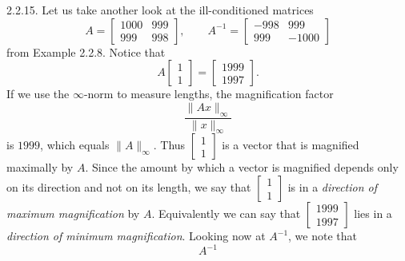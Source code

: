 \documentclass{report}
\begin{document}
    \bigbreak \noindent 
    \begin{mdframed}
        2.2.15. Let us take another look at the ill-conditioned matrices
        \[
            A = 
            \begin{bmatrix}
                1000 & 999 \\
                999  & 998
            \end{bmatrix},
            \qquad
            A^{-1} =
            \begin{bmatrix}
                -998 & 999 \\
                999  & -1000
            \end{bmatrix}
        \]
        from Example 2.2.8. Notice that
        \[
            A
            \begin{bmatrix}
                1 \\
                1
            \end{bmatrix}
            =
            \begin{bmatrix}
                1999 \\
                1997
            \end{bmatrix}.
            \tag{2.2.16}
        \]
        If we use the $\infty$-norm to measure lengths, the magnification factor 
        \[
            \frac{\|Ax\|_{\infty}}{\|x\|_{\infty}}
        \]
        is $1999$, which equals $\|A\|_{\infty}$. Thus 
        \(
        \begin{bmatrix}
            1 \\ 1
        \end{bmatrix}
        \) 
        is a vector that is magnified maximally by $A$. 
        \bigbreak \noindent 
        Since the amount by which a vector is magnified depends only on its direction and not on its length, 
        we say that 
        \(
        \begin{bmatrix}
            1 \\ 1
        \end{bmatrix}
        \) 
        is in a \textit{direction of maximum magnification} by $A$. 
        \bigbreak \noindent 
        Equivalently we can say that 
        \(
        \begin{bmatrix}
            1999 \\ 1997
        \end{bmatrix}
        \) 
        lies in a \textit{direction of minimum magnification}.
        \bigbreak \noindent 
        Looking now at $A^{-1}$, we note that
        \[
            A^{-1} 
\]
\end{mdframed}
\end{document}
